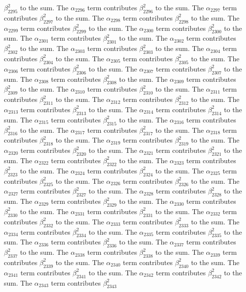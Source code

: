 \begin{lemma}
$\beta_{2295}^{2}$ to the sum. The $\alpha_{2296}$ term contributes $\beta_{2296}^{2}$ to the sum. The $\alpha_{2297}$ term contributes $\beta_{2297}^{2}$ to the sum. The $\alpha_{2298}$ term contributes $\beta_{2298}^{2}$ to the sum. The $\alpha_{2299}$ term contributes $\beta_{2299}^{2}$ to the sum. The $\alpha_{2300}$ term contributes $\beta_{2300}^{2}$ to the sum. The $\alpha_{2301}$ term contributes $\beta_{2301}^{2}$ to the sum. The $\alpha_{2302}$ term contributes $\beta_{2302}^{2}$ to the sum. The $\alpha_{2303}$ term contributes $\beta_{2303}^{2}$ to the sum. The $\alpha_{2304}$ term contributes $\beta_{2304}^{2}$ to the sum. The $\alpha_{2305}$ term contributes $\beta_{2305}^{2}$ to the sum. The $\alpha_{2306}$ term contributes $\beta_{2306}^{2}$ to the sum. The $\alpha_{2307}$ term contributes $\beta_{2307}^{2}$ to the sum. The $\alpha_{2308}$ term contributes $\beta_{2308}^{2}$ to the sum. The $\alpha_{2309}$ term contributes $\beta_{2309}^{2}$ to the sum. The $\alpha_{2310}$ term contributes $\beta_{2310}^{2}$ to the sum. The $\alpha_{2311}$ term contributes $\beta_{2311}^{2}$ to the sum. The $\alpha_{2312}$ term contributes $\beta_{2312}^{2}$ to the sum. The $\alpha_{2313}$ term contributes $\beta_{2313}^{2}$ to the sum. The $\alpha_{2314}$ term contributes $\beta_{2314}^{2}$ to the sum. The $\alpha_{2315}$ term contributes $\beta_{2315}^{2}$ to the sum. The $\alpha_{2316}$ term contributes $\beta_{2316}^{2}$ to the sum. The $\alpha_{2317}$ term contributes $\beta_{2317}^{2}$ to the sum. The $\alpha_{2318}$ term contributes $\beta_{2318}^{2}$ to the sum. The $\alpha_{2319}$ term contributes $\beta_{2319}^{2}$ to the sum. The $\alpha_{2320}$ term contributes $\beta_{2320}^{2}$ to the sum. The $\alpha_{2321}$ term contributes $\beta_{2321}^{2}$ to the sum. The $\alpha_{2322}$ term contributes $\beta_{2322}^{2}$ to the sum. The $\alpha_{2323}$ term contributes $\beta_{2323}^{2}$ to the sum. The $\alpha_{2324}$ term contributes $\beta_{2324}^{2}$ to the sum. The $\alpha_{2325}$ term contributes $\beta_{2325}^{2}$ to the sum. The $\alpha_{2326}$ term contributes $\beta_{2326}^{2}$ to the sum. The $\alpha_{2327}$ term contributes $\beta_{2327}^{2}$ to the sum. The $\alpha_{2328}$ term contributes $\beta_{2328}^{2}$ to the sum. The $\alpha_{2329}$ term contributes $\beta_{2329}^{2}$ to the sum. The $\alpha_{2330}$ term contributes $\beta_{2330}^{2}$ to the sum. The $\alpha_{2331}$ term contributes $\beta_{2331}^{2}$ to the sum. The $\alpha_{2332}$ term contributes $\beta_{2332}^{2}$ to the sum. The $\alpha_{2333}$ term contributes $\beta_{2333}^{2}$ to the sum. The $\alpha_{2334}$ term contributes $\beta_{2334}^{2}$ to the sum. The $\alpha_{2335}$ term contributes $\beta_{2335}^{2}$ to the sum. The $\alpha_{2336}$ term contributes $\beta_{2336}^{2}$ to the sum. The $\alpha_{2337}$ term contributes $\beta_{2337}^{2}$ to the sum. The $\alpha_{2338}$ term contributes $\beta_{2338}^{2}$ to the sum. The $\alpha_{2339}$ term contributes $\beta_{2339}^{2}$ to the sum. The $\alpha_{2340}$ term contributes $\beta_{2340}^{2}$ to the sum. The $\alpha_{2341}$ term contributes $\beta_{2341}^{2}$ to the sum. The $\alpha_{2342}$ term contributes $\beta_{2342}^{2}$ to the sum. The $\alpha_{2343}$ term contributes $\beta_{2343}^{2}$ 
\end{lemma}
